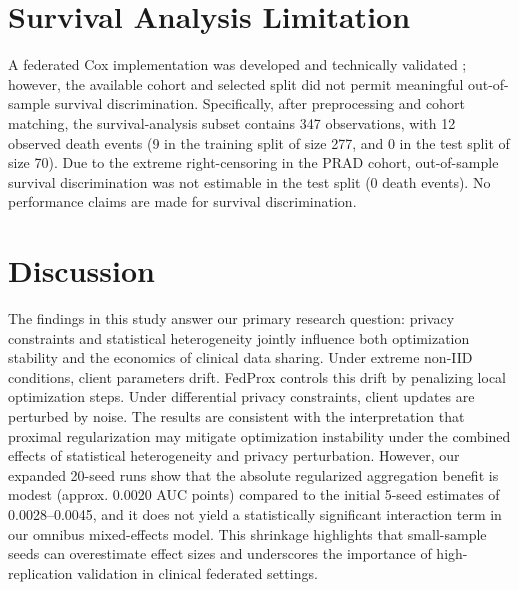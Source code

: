 \documentclass[conference]{IEEEtran}
\begin{document}
\section{Survival Analysis Limitation}
A federated Cox implementation was developed and technically validated \cite{Sadovsky2023SurvivalFL}; however, the available cohort and selected split did not permit meaningful out-of-sample survival discrimination. Specifically, after preprocessing and cohort matching, the survival-analysis subset contains 347 observations, with 12 observed death events (9 in the training split of size 277, and 0 in the test split of size 70). Due to the extreme right-censoring in the PRAD cohort, out-of-sample survival discrimination was not estimable in the test split (0 death events). No performance claims are made for survival discrimination.

\section{Discussion}
The findings in this study answer our primary research question: privacy constraints and statistical heterogeneity jointly influence both optimization stability and the economics of clinical data sharing. Under extreme non-IID conditions, client parameters drift. FedProx controls this drift by penalizing local optimization steps. Under differential privacy constraints, client updates are perturbed by noise. The results are consistent with the interpretation that proximal regularization may mitigate optimization instability under the combined effects of statistical heterogeneity and privacy perturbation. However, our expanded 20-seed runs show that the absolute regularized aggregation benefit is modest (approx. 0.0020 AUC points) compared to the initial 5-seed estimates of 0.0028--0.0045, and it does not yield a statistically significant interaction term in our omnibus mixed-effects model. This shrinkage highlights that small-sample seeds can overestimate effect sizes and underscores the importance of high-replication validation in clinical federated settings.
\end{document}
